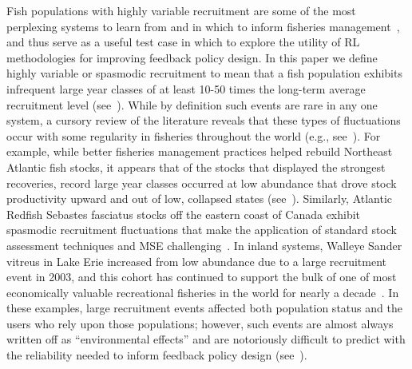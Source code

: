 \documentclass[floatfix,nofootinbib,longbibliography,notitlepage]{revtex4-2}
\def\eg{e.g.}
\begin{document}
Fish populations with highly variable recruitment are some of the most perplexing systems to learn from and in which to inform fisheries management~\cite{hjort1914,caddy-gulland}, and thus serve as a useful test case in which to explore the utility of RL methodologies for improving feedback policy design.  
In this paper we define highly variable or spasmodic recruitment to mean that a fish population exhibits infrequent large year classes of at least 10-50 times the long-term average recruitment level (see~\cite{caddy-gulland}).  
While by definition such events are rare in any one system, a cursory review of the literature reveals that these types of fluctuations occur with some regularity in fisheries throughout the world (\eg, see~\cite{fisch-etal-2019,licandeo-etal-2020}).  
For example, while better fisheries management practices helped rebuild Northeast Atlantic fish stocks, it appears that of the stocks that displayed the strongest recoveries, record large year classes occurred at low abundance that drove stock productivity upward and out of low, collapsed states (see~\cite{zimmermann2019improved}).  
Similarly, Atlantic Redfish Sebastes fasciatus stocks off the eastern coast of Canada exhibit spasmodic recruitment fluctuations that make the application of standard stock assessment techniques and MSE challenging~\cite{licandeo-etal-2020}.  
In inland systems, Walleye Sander vitreus in Lake Erie increased from low abundance due to a large recruitment event in 2003, and this cohort has continued to support the bulk of one of most economically valuable recreational fisheries in the world for nearly a decade~\cite{schmitt-vandergoot}.  
In these examples, large recruitment events affected both population status and the users who rely upon those populations; however, such events are almost always written off as “environmental effects” and are notoriously difficult to predict with the reliability needed to inform feedback policy design (see~\cite{punt2014, myers1998}).  
	
\end{document}
